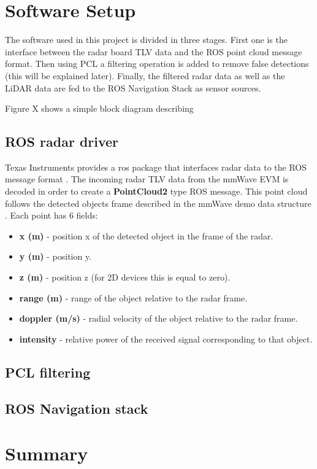 \subsection{}

\section{Software Setup}

The software used in this project is divided in three stages. First one is the interface between the radar board TLV data and the ROS point cloud message format. Then using \ac{PCL} a filtering operation is added to remove false detections (this will be explained later). Finally, the filtered radar data as well as the \ac{LiDAR} data are fed to the ROS Navigation Stack as sensor sources. 

Figure X shows a simple block diagram describing    
\subsection{ROS radar driver}
Texas Instruments provides a ros package that interfaces radar data to the ROS message format \cite{tidriver}. The incoming radar TLV data from the mmWave EVM is decoded in order to create a  \textbf{PointCloud2} type ROS message.
This point cloud follows the detected objects frame described in the mmWave demo data structure \cite{}. 
Each point has 6 fields:
\begin{itemize}
\item \textbf{x (m)} - position x of the detected  object in the frame of the radar.
\item \textbf{y (m)} - position y.
\item \textbf{z (m)} - position z (for 2D devices this is equal to zero).
\item \textbf{range (m)} - range of the object relative to the radar frame.
\item \textbf{doppler (m/s)} - radial velocity of the object relative to the radar frame.
\item \textbf{intensity} - relative power of the received signal corresponding to that object.
\end{itemize}
\subsection{\ac{PCL} filtering}

\subsection{ROS Navigation stack}


\section{Summary}   

